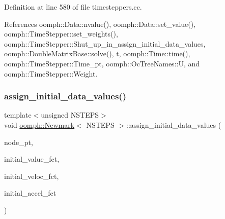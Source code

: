 Definition at line 580 of file timesteppers.\+cc.



References oomph\+::\+Data\+::nvalue(), oomph\+::\+Data\+::set\+\_\+value(), oomph\+::\+Time\+Stepper\+::set\+\_\+weights(), oomph\+::\+Time\+Stepper\+::\+Shut\+\_\+up\+\_\+in\+\_\+assign\+\_\+initial\+\_\+data\+\_\+values, oomph\+::\+Double\+Matrix\+Base\+::solve(), t, oomph\+::\+Time\+::time(), oomph\+::\+Time\+Stepper\+::\+Time\+\_\+pt, oomph\+::\+Oc\+Tree\+Names\+::U, and oomph\+::\+Time\+Stepper\+::\+Weight.

\mbox{\label{classoomph_1_1Newmark_af5c92160bf14bf311e4bdab2016361f2}} 
\subsubsection{\texorpdfstring{assign\+\_\+initial\+\_\+data\+\_\+values()}{assign\_initial\_data\_values()}\hspace{0.1cm}{\footnotesize\ttfamily [2/2]}}
{\footnotesize\ttfamily template$<$unsigned N\+S\+T\+E\+PS$>$ \\
void \hyperlink{classoomph_1_1Newmark}{oomph\+::\+Newmark}$<$ N\+S\+T\+E\+PS $>$\+::assign\+\_\+initial\+\_\+data\+\_\+values (\begin{DoxyParamCaption}\item[{\hyperlink{classoomph_1_1Node}{Node} $\ast$const \&}]{node\+\_\+pt,  }\item[{\hyperlink{classoomph_1_1Vector}{Vector}$<$ \hyperlink{classoomph_1_1Newmark_af7c5c0d8127484525f751f084aa36d67}{Node\+Initial\+Condition\+Fct\+Pt} $>$}]{initial\+\_\+value\+\_\+fct,  }\item[{\hyperlink{classoomph_1_1Vector}{Vector}$<$ \hyperlink{classoomph_1_1Newmark_af7c5c0d8127484525f751f084aa36d67}{Node\+Initial\+Condition\+Fct\+Pt} $>$}]{initial\+\_\+veloc\+\_\+fct,  }\item[{\hyperlink{classoomph_1_1Vector}{Vector}$<$ \hyperlink{classoomph_1_1Newmark_af7c5c0d8127484525f751f084aa36d67}{Node\+Initial\+Condition\+Fct\+Pt} $>$}]{initial\+\_\+accel\+\_\+fct }\end{DoxyParamCaption})}



